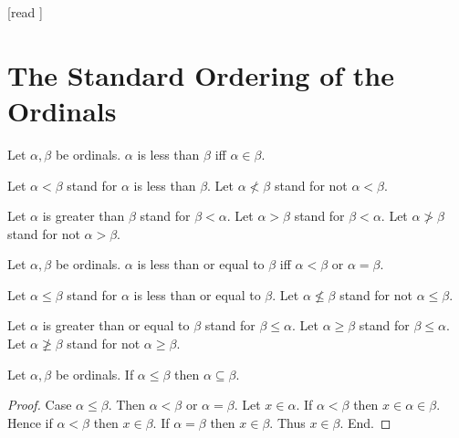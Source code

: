 \documentclass[10pt]{article}
\begin{document}
  \begin{imports}
    \begin{forthel}
      [read ]
    \end{forthel}
  \end{imports}


  \section*{The Standard Ordering of the Ordinals}

  \begin{forthel}
    \begin{definition}[id=SET_THEORY_02_6654252130762752,printid]
      Let $\alpha, \beta$ be ordinals.
      $\alpha$ is less than $\beta$ iff $\alpha \in \beta$.
    \end{definition}

    Let $\alpha < \beta$ stand for $\alpha$ is less than $\beta$.
    Let $\alpha \nless \beta$ stand for not $\alpha < \beta$.

    Let $\alpha$ is greater than $\beta$ stand for $\beta < \alpha$.
    Let $\alpha > \beta$ stand for $\beta < \alpha$.
    Let $\alpha \ngtr \beta$ stand for not $\alpha > \beta$.
  \end{forthel}

  \begin{forthel}
    \begin{definition}[id=SET_THEORY_02_2639956210089984,printid]
      Let $\alpha, \beta$ be ordinals.
      $\alpha$ is less than or equal to $\beta$ iff $\alpha < \beta$ or $\alpha = \beta$.
    \end{definition}

    Let $\alpha \leq \beta$ stand for $\alpha$ is less than or equal to $\beta$.
    Let $\alpha \nleq \beta$ stand for not $\alpha \leq \beta$.

    Let $\alpha$ is greater than or equal to $\beta$ stand for $\beta \leq \alpha$.
    Let $\alpha \geq \beta$ stand for $\beta \leq \alpha$.
    Let $\alpha \ngeq \beta$ stand for not $\alpha \geq \beta$.
  \end{forthel}

  \begin{forthel}
    \begin{proposition}[id=SET_THEORY_02_3089369577553920,printid]
      Let $\alpha, \beta$ be ordinals.
      If $\alpha \leq \beta$ then $\alpha \subseteq \beta$.
    \end{proposition}
    \begin{proof}
      Case $\alpha \leq \beta$.
        Then $\alpha < \beta$ or $\alpha = \beta$.
        Let $x \in \alpha$.
        If $\alpha < \beta$ then $x \in \alpha \in \beta$.
        Hence if $\alpha < \beta$ then $x \in \beta$.
        If $\alpha = \beta$ then $x \in \beta$.
        Thus $x \in \beta$.
      End.
    \end{proof}
  \end{forthel}
\end{document}
